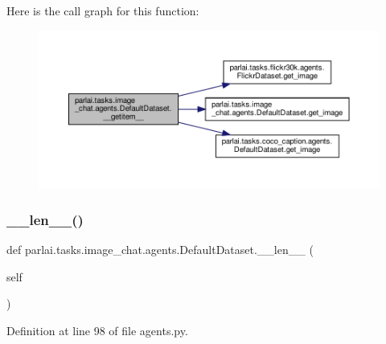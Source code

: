 Here is the call graph for this function\+:
\nopagebreak
\begin{figure}[H]
\begin{center}
\leavevmode
\includegraphics[width=350pt]{classparlai_1_1tasks_1_1image__chat_1_1agents_1_1DefaultDataset_a613fca15fd01c49632e751eebe2fefa9_cgraph}
\end{center}
\end{figure}
\mbox{\label{classparlai_1_1tasks_1_1image__chat_1_1agents_1_1DefaultDataset_ae786128b555cabc38b32841f4569ee62}} 
\subsubsection{\texorpdfstring{\+\_\+\+\_\+len\+\_\+\+\_\+()}{\_\_len\_\_()}}
{\footnotesize\ttfamily def parlai.\+tasks.\+image\+\_\+chat.\+agents.\+Default\+Dataset.\+\_\+\+\_\+len\+\_\+\+\_\+ (\begin{DoxyParamCaption}\item[{}]{self }\end{DoxyParamCaption})}



Definition at line 98 of file agents.\+py.



